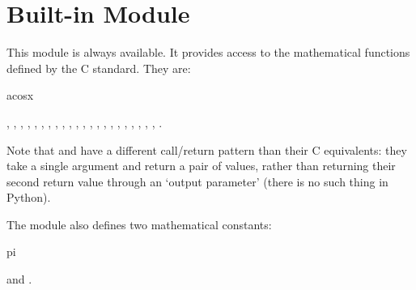 \section{Built-in Module }

\renewcommand{\indexsubitem}{(in module math)}
This module is always available.
It provides access to the mathematical functions defined by the C
standard.
They are:
\iftexi
\begin{funcdesc}{acos}{x}
\end{funcdesc}
\else
{},
,
,
,
,
,
,
,
,
,
,
,
,
,
,
,
,
,
,
,
,
,
.
\fi

Note that  and  have a different call/return
pattern than their C equivalents: they take a single argument and
return a pair of values, rather than returning their second return
value through an `output parameter' (there is no such thing in Python).

The module also defines two mathematical constants:
\iftexi
\begin{datadesc}{pi}
\end{datadesc}
\else
{} and .
\fi
